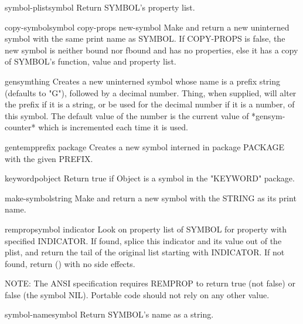 \documentclass[10pt,english]{book}
\begin{document}
\begin{accessor}{symbol-plist}{symbol}
  Return SYMBOL's property list.
\end{accessor}


\begin{function}{copy-symbol}{symbol \op copy-props \aux new-symbol}
  Make and return a new uninterned symbol with the same print name
  as SYMBOL. If COPY-PROPS is false, the new symbol is neither bound
  nor fbound and has no properties, else it has a copy of SYMBOL's
  function, value and property list.
\end{function}

\begin{function}{gensym}{\op thing}
  Creates a new uninterned symbol whose name is a prefix string (defaults
   to "G"), followed by a decimal number. Thing, when supplied, will
   alter the prefix if it is a string, or be used for the decimal number
   if it is a number, of this symbol. The default value of the number is
   the current value of *gensym-counter* which is incremented each time
   it is used.
\end{function}

\begin{function}{gentemp}{\op prefix package}
  Creates a new symbol interned in package PACKAGE with the given PREFIX.
\end{function}

\begin{function}{keywordp}{object}
  Return true if Object is a symbol in the "KEYWORD" package.
\end{function}

\begin{function}{make-symbol}{string}
  Make and return a new symbol with the STRING as its print name.
\end{function}

\begin{function}{remprop}{symbol indicator}
  Look on property list of SYMBOL for property with specified
  INDICATOR. If found, splice this indicator and its value out of
  the plist, and return the tail of the original list starting with
  INDICATOR. If not found, return () with no side effects.

  NOTE: The ANSI specification requires REMPROP to return true (not false)
  or false (the symbol NIL). Portable code should not rely on any other value.
\end{function}

\begin{function}{symbol-name}{symbol}
  Return SYMBOL's name as a string.
\end{function}
\end{document}
